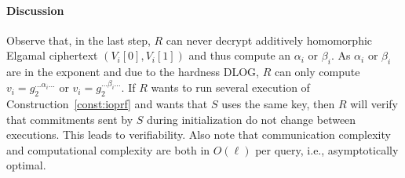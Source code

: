 \paragraph{Discussion}
Observe that, in the last step, $R$ can never decrypt
additively homomorphic Elgamal ciphertext $(V_i[0],V_i[1])$ and thus
compute an $\alpha_i$ or $\beta_i$. As $\alpha_i$ or $\beta_i$ are in
the exponent and due to the hardness DLOG, $R$ can only
compute $v_i=g_2^{\ldots\alpha_i\ldots}$ or
$v_i=g_2^{\ldots\beta_i\ldots}$.
If $R$ wants to run several execution of
Construction~\ref{const:ioprf} and wants that $S$ uses the same key,
then $R$ will verify that commitments sent by $S$ during initialization do not change between executions. This
leads to {verifiability}.
Also note that communication complexity and computational complexity
are both in $O(\ell)$ per query, i.e.,  asymptotically
optimal.



